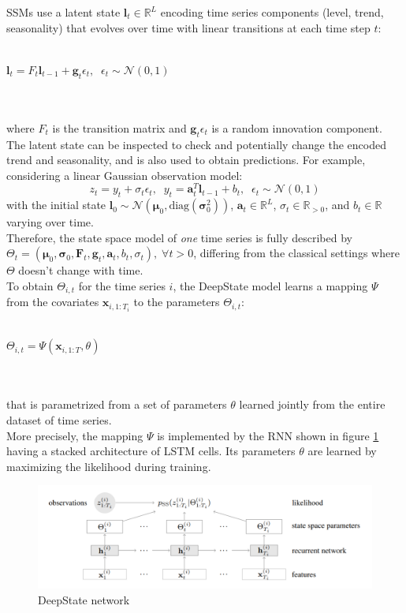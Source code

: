 \documentclass[a4paper, 12pt]{article} %
\begin{document}
	SSMs use a latent state $\pmb{l}_t \in \mathbb{R}^L$ encoding time series components (level, trend, seasonality) that evolves over time with linear transitions at each time step $t$:\\\\
	\centerline{
	$
	\pmb{l}_t = F_t \pmb{l}_{t-1} + \pmb{g }_t \epsilon_t, \;\; \epsilon_t \sim \mathcal{N}(0,1)
	$
	}\\\\
	where $F_t$ is the transition matrix and $\pmb{g }_t \epsilon_t$ is a random innovation component. The latent state can be inspected to check and potentially change the encoded trend and seasonality, and is also used to obtain predictions. For example, considering a linear Gaussian observation model:
	\begin{equation} \label{eq:deepstate}
			z_t = y_t + \sigma_t \epsilon_t, \;\; y_t = \pmb{a}_t^T \pmb{l}_{t-1} + b_t, \;\; \epsilon_t \sim \mathcal{N}(0,1)
	\end{equation}
	with the initial state $\pmb{l}_0 \sim \mathcal{N}(\pmb{\mu}_0, \text{diag}(\pmb{\sigma}_0^2))$, $\pmb{a}_t \in \mathbb{R}^L$, $\sigma_t \in \mathbb{R}_{>0}$, and $b_t \in \mathbb{R}$ varying over time. \\
	Therefore, the state space model of \textit{one} time series is fully described by $\Theta_t = (\pmb{\mu}_0, \pmb{\sigma}_0, \pmb{F}_t, \pmb{g}_ t, \pmb{a}_t, b_t, \sigma_t), \; \forall t > 0$, differing from the classical settings where $\Theta$ doesn't change with time.\\
	To obtain $\Theta_{i,t}$ for the time series $i$, the DeepState model learns a mapping $\Psi$ from the covariates $\pmb{x}_{i, 1:T_i}$ to the parameters $\Theta_{i, t}$:\\\\
	\centerline{
	$
	\Theta_{i,t} = \Psi(\pmb{x}_{i, 1:T}, \theta)
	$
	}\\\\
	that is parametrized from a set of parameters $\theta$ learned jointly from the entire dataset of time series. \\
	More precisely, the mapping $\Psi$ is implemented by the RNN shown in figure \ref{fig:deepstate} having a stacked architecture of LSTM cells. Its parameters $\theta$ are learned by maximizing the likelihood during training.
	\begin{figure}
		\includegraphics[width=\linewidth]{img/deepstate.png}
		\caption{DeepState network}
		\label{fig:deepstate}
	\end{figure}
\end{document}

